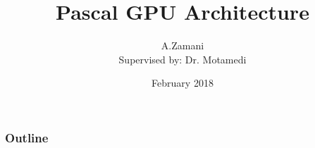\documentclass{beamer}
\title[Pascal GPU Architecture]{Pascal GPU Architecture} %
\author[A.Zamani]{A.Zamani\\[1mm]{\small Supervised by: Dr. Motamedi}} %
\institute[AUT] %
{
Amirkabir University of Technology \\ %
}
\date[February 2018]{February 2018} %
\begin{document}
\begin{frame}
\titlepage %
\end{frame}

\begin{frame}
\frametitle{Outline} %
\tableofcontents %
\end{frame}


\end{document}

